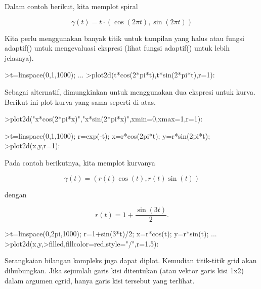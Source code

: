 \documentclass[a4paper,10pt]{article}
\begin{document}
\begin{eulernotebook}
\begin{eulercomment}
\begin{eulercomment}
\begin{eulercomment}
\begin{eulercomment}
\begin{eulercomment}
\begin{eulercomment}
\begin{eulercomment}
Dalam contoh berikut, kita memplot spiral

\end{eulercomment}
\begin{eulerformula}
\[
\gamma(t) = t \cdot (\cos(2\pi t),\sin(2\pi t))
\]
\end{eulerformula}
\begin{eulercomment}
Kita perlu menggunakan banyak titik untuk tampilan yang halus atau
fungsi adaptif() untuk mengevaluasi ekspresi (lihat fungsi adaptif()
untuk lebih jelasnya).
\end{eulercomment}
\begin{eulerprompt}
>t=linspace(0,1,1000); ...
>plot2d(t*cos(2*pi*t),t*sin(2*pi*t),r=1):
\end{eulerprompt}
\begin{eulercomment}
Sebagai alternatif, dimungkinkan untuk menggunakan dua ekspresi untuk
kurva. Berikut ini plot kurva yang sama seperti di atas.
\end{eulercomment}
\begin{eulerprompt}
>plot2d("x*cos(2*pi*x)","x*sin(2*pi*x)",xmin=0,xmax=1,r=1):
\end{eulerprompt}
\begin{eulerprompt}
>t=linspace(0,1,1000); r=exp(-t); x=r*cos(2pi*t); y=r*sin(2pi*t);
>plot2d(x,y,r=1):
\end{eulerprompt}
\begin{eulercomment}
Pada contoh berikutnya, kita memplot kurvanya

\end{eulercomment}
\begin{eulerformula}
\[
\gamma(t) = (r(t) \cos(t), r(t) \sin(t))
\]
\end{eulerformula}
\begin{eulercomment}
dengan

\end{eulercomment}
\begin{eulerformula}
\[
r(t) = 1 + \dfrac{\sin(3t)}{2}.
\]
\end{eulerformula}
\begin{eulerprompt}
>t=linspace(0,2pi,1000); r=1+sin(3*t)/2; x=r*cos(t); y=r*sin(t); ...
>plot2d(x,y,>filled,fillcolor=red,style="/",r=1.5):
\end{eulerprompt}
\begin{eulercomment}
Serangkaian bilangan kompleks juga dapat diplot. Kemudian titik-titik
grid akan dihubungkan. Jika sejumlah garis kisi ditentukan (atau
vektor garis kisi 1x2) dalam argumen cgrid, hanya garis kisi tersebut
yang terlihat.


\end{eulercomment}
\end{eulercomment}
\end{eulercomment}
\end{eulercomment}
\end{eulercomment}
\end{eulercomment}
\end{eulercomment}
\end{eulernotebook}
\end{document}
